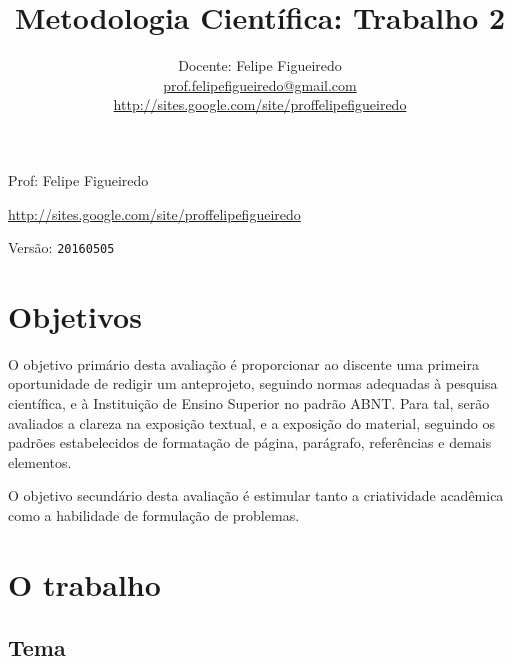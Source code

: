 \documentclass[a4paper]{article}
\title{Metodologia Científica: Trabalho 2}
\date{}
\author{Docente: Felipe Figueiredo\\
  \url{prof.felipefigueiredo@gmail.com}\\
  \url{http://sites.google.com/site/proffelipefigueiredo}
}
\begin{document}
\maketitle
{}

\newpage

\parbox[c]{.825\textwidth}{\raggedright%
{Prof: Felipe Figueiredo\par}
{\url{http://sites.google.com/site/proffelipefigueiredo}\par}
}

Versão: \verb|20160505|




\section{Objetivos}
O objetivo primário desta avaliação é proporcionar ao discente uma primeira oportunidade de redigir um anteprojeto, seguindo normas adequadas à pesquisa científica, e à Instituição de Ensino Superior no padrão ABNT.
Para tal, serão avaliados a clareza na exposição textual, e a exposição do material, seguindo os padrões estabelecidos de formatação de página, parágrafo, referências e demais elementos.

O objetivo secundário desta avaliação é estimular tanto a criatividade acadêmica como a habilidade de formulação de problemas.

\section{O trabalho}

\subsection{Tema}
\end{document}

